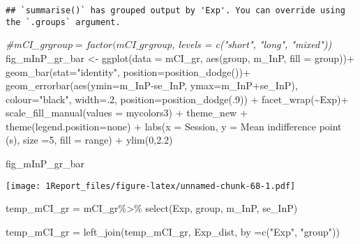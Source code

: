 \documentclass[
]{article}
\newenvironment{Shaded}{\begin{snugshade}}{\end{snugshade}}
\newcommand{\AttributeTok}[1]{\textcolor[rgb]{0.77,0.63,0.00}{#1}}
\newcommand{\CommentTok}[1]{\textcolor[rgb]{0.56,0.35,0.01}{\textit{#1}}}
\newcommand{\DecValTok}[1]{\textcolor[rgb]{0.00,0.00,0.81}{#1}}
\newcommand{\FloatTok}[1]{\textcolor[rgb]{0.00,0.00,0.81}{#1}}
\newcommand{\FunctionTok}[1]{\textcolor[rgb]{0.00,0.00,0.00}{#1}}
\newcommand{\NormalTok}[1]{#1}
\newcommand{\OtherTok}[1]{\textcolor[rgb]{0.56,0.35,0.01}{#1}}
\newcommand{\SpecialCharTok}[1]{\textcolor[rgb]{0.00,0.00,0.00}{#1}}
\newcommand{\StringTok}[1]{\textcolor[rgb]{0.31,0.60,0.02}{#1}}
\begin{document}
\begin{verbatim}
## `summarise()` has grouped output by 'Exp'. You can override using the `.groups` argument.
\end{verbatim}

\begin{Shaded}
\begin{Highlighting}[]
\CommentTok{\#mCI\_gr$group = factor(mCI\_gr$group, levels = c("short", "long", "mixed"))}
\NormalTok{fig\_mInP\_gr\_bar }\OtherTok{\textless{}{-}} \FunctionTok{ggplot}\NormalTok{(}\AttributeTok{data =}\NormalTok{ mCI\_gr, }\FunctionTok{aes}\NormalTok{(group, m\_InP, }\AttributeTok{fill =}\NormalTok{ group))}\SpecialCharTok{+}
  \FunctionTok{geom\_bar}\NormalTok{(}\AttributeTok{stat=}\StringTok{"identity"}\NormalTok{, }\AttributeTok{position=}\FunctionTok{position\_dodge}\NormalTok{())}\SpecialCharTok{+}
  \FunctionTok{geom\_errorbar}\NormalTok{(}\FunctionTok{aes}\NormalTok{(}\AttributeTok{ymin=}\NormalTok{m\_InP}\SpecialCharTok{{-}}\NormalTok{se\_InP, }\AttributeTok{ymax=}\NormalTok{m\_InP}\SpecialCharTok{+}\NormalTok{se\_InP), }\AttributeTok{colour=}\StringTok{"black"}\NormalTok{, }\AttributeTok{width=}\NormalTok{.}\DecValTok{2}\NormalTok{, }\AttributeTok{position=}\FunctionTok{position\_dodge}\NormalTok{(.}\DecValTok{9}\NormalTok{)) }\SpecialCharTok{+} 
  \FunctionTok{facet\_wrap}\NormalTok{(}\SpecialCharTok{\textasciitilde{}}\NormalTok{Exp)}\SpecialCharTok{+}
  \FunctionTok{scale\_fill\_manual}\NormalTok{(}\AttributeTok{values =}\NormalTok{ mycolors3) }\SpecialCharTok{+}
\NormalTok{  theme\_new }\SpecialCharTok{+} \FunctionTok{theme}\NormalTok{(}\AttributeTok{legend.position=}\StringTok{\textquotesingle{}none\textquotesingle{}}\NormalTok{) }\SpecialCharTok{+}
  \FunctionTok{labs}\NormalTok{(}\AttributeTok{x =} \StringTok{\textquotesingle{}Session\textquotesingle{}}\NormalTok{, }\AttributeTok{y =} \StringTok{\textquotesingle{}Mean indifference point (s)\textquotesingle{}}\NormalTok{, }\AttributeTok{size =}\DecValTok{5}\NormalTok{,  }\AttributeTok{fill =} \StringTok{\textquotesingle{}range\textquotesingle{}}\NormalTok{) }\SpecialCharTok{+} \FunctionTok{ylim}\NormalTok{(}\DecValTok{0}\NormalTok{,}\FloatTok{2.2}\NormalTok{)}

\NormalTok{fig\_mInP\_gr\_bar}
\end{Highlighting}
\end{Shaded}

\texttt{[image: 1Report\_files/figure-latex/unnamed-chunk-68-1.pdf]}

\begin{Shaded}
\begin{Highlighting}[]
\NormalTok{temp\_mCI\_gr }\OtherTok{=}\NormalTok{ mCI\_gr}\SpecialCharTok{\%\textgreater{}\%} \FunctionTok{select}\NormalTok{(Exp, group, m\_InP, se\_InP)}

\NormalTok{temp\_mCI\_gr }\OtherTok{=} \FunctionTok{left\_join}\NormalTok{(temp\_mCI\_gr, Exp\_dist,  }\AttributeTok{by =}\FunctionTok{c}\NormalTok{(}\StringTok{"Exp"}\NormalTok{, }\StringTok{"group"}\NormalTok{))}
\end{Highlighting}
\end{Shaded}
\end{document}
